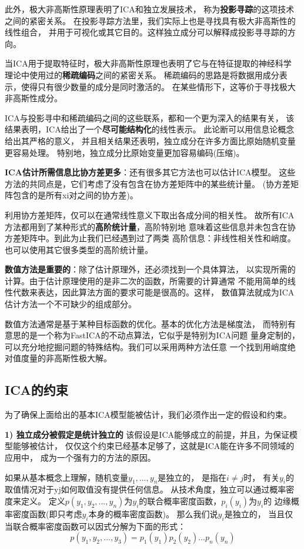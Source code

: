 此外，极大非高斯性原理表明了ICA和独立发展技术，
称为\textbf{投影寻踪}的这项技术之间的紧密关系。
在投影寻踪方法里，我们实际上也是寻找具有极大非高斯性的线性组合，
并用于可视化或其它目的。这样独立成分可以解释成投影寻寻踪的方向。
    
当ICA用于提取特征时，极大非高斯性原理也表明了它与在特征提取的神经科学
理论中使用过的\textbf{稀疏编码}之间的紧密关系。
稀疏编码的思路是将数据用成分表示，使得只有很少数量的成分是同时激活的。
在某些情形下，这等价于寻找极大非高斯性成分。

ICA与投影寻中和稀疏编码之间的这些联系，都和一个更为深入的结果有关，
该结果表明，ICA给出了一个\textbf{尽可能结构化}的线性表示。
此论断可以用信息论概念给出其严格的意义，
并且相关结果还表明，独立成分在许多方面比原始随机变量更容易处理。
特别地，独立成分比原始变量更加容易编码(压缩)。
    
\textbf{ICA估计所需信息比协方差更多}：还有很多其它方法也可以估计ICA模型。
这些方法的共同点是，它们考虑了没有包含在协方差矩阵中的某些统计量。
(协方差矩阵包含的是所有xi对之间的协方差)。

利用协方差矩阵，仅可以在通常线性意义下取出各成分间的相关性。
故所有ICA方法都用到了某种形式的\textbf{高阶统计量}，高阶特别地
意味着这些信息并未包含在协方差矩阵中。到此为止我们已经遇到过了两类
高阶信息：非线性相关性和峭度。也可以使用其它很多类型的高阶统计量。
    
\textbf{数值方法是重要的}：除了估计原理外，还必须找到一个具体算法，
以实现所需的计算。由于估计原理使用的是非二次的函数，所需要的计算通常
不能用简单的线性代数来表达，因此算法方面的要求可能是很高的。这样，
数值算法就成为ICA估计方法一个不可缺少的组成部分。

数值方法通常是基于某种目标函数的优化。基本的优化方法是梯度法，
而特别有意思的是一个称为FastICA的不动点算法，它似乎是特别为ICA问题
量身定制的，可以充分地挖掘问题的特殊结构。我们可以采用两种方法任意
一个找到用峭度绝对值度量的非高斯性极大解。
    
\subsection{ICA的约束}
为了确保上面给出的基本ICA模型能被估计，我们必须作出一定的假设和约束。

\textbf{1) 独立成分被假定是统计独立的}
该假设是ICA能够成立的前提，并且，为保证模型能够被估计，
仅仅这个约束已经基本足够了，这就是ICA能在许多不同领域的应用中，
成为一个强有力的方法的原因。

如果从基本概念上理解，随机变量$y_1,...,y_n$是独立的，
是指在$i \ne j$时，
有关$y_i$的取值情况对于yj如何取值没有提供任何信息。
从技术角度，独立可以通过概率密度来定义。
定义$p(y_1,y_2,...,y_n)$为$y_i$的联合概率密度函数，$p_i(y_i)$为$y_i$的
边缘概率密度函数(即只考虑$y_i$本身的概率密度函数)。
那么我们说$y_i$是独立的，
当且仅当联合概率密度函数可以因式分解为下面的形式：
\begin{equation}
p(y_1, y_2, ..., y_3) = p_1(y_1)p_2(y_2)...p_n (y_n)
\end{equation}


